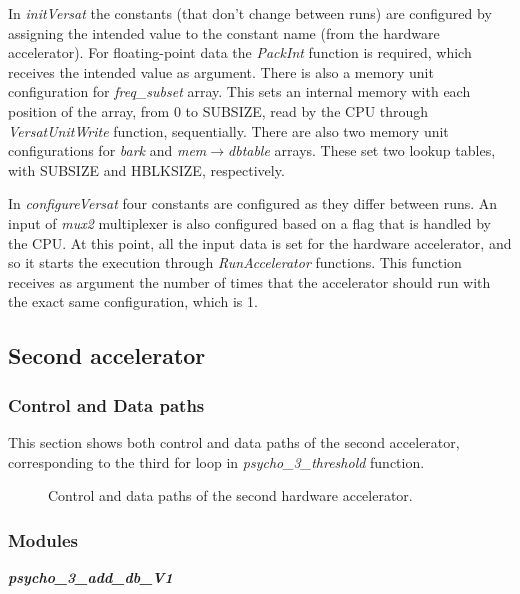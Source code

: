 \documentclass{article}
\begin{document}
In \textit{initVersat} the constants (that don't change between runs) are configured by assigning the intended value to the constant name (from the hardware accelerator). For floating-point data the \textit{PackInt} function is required, which receives the intended value as argument.
There is also a memory unit configuration for \textit{freq\_subset} array. This sets an internal memory with each position of the array, from 0 to SUBSIZE, read by the CPU through \textit{VersatUnitWrite} function, sequentially.
There are also two memory unit configurations for \textit{bark} and \textit{mem}$\rightarrow$\textit{dbtable} arrays. These set two lookup tables, with SUBSIZE and HBLKSIZE, respectively.

In \textit{configureVersat} four constants are configured as they differ between runs. An input of \textit{mux2} multiplexer is also configured based on a flag that is handled by the CPU.
At this point, all the input data is set for the hardware accelerator, and so it starts the execution through \textit{RunAccelerator} functions. This function receives as argument the number of times that the accelerator should run with the exact same configuration, which is 1.


\subsection{Second accelerator}

\subsubsection{Control and Data paths}
This section shows both control and data paths of the second accelerator, corresponding to the third for loop in \textit{psycho\_3\_threshold} function.

\begin{figure}[H]
\centerline{}
\caption{Control and data paths of the second hardware accelerator.}
\label{data2}
\end{figure}

\subsubsection{Modules}

\vspace{0.5cm}

\textbf{\textit{psycho\_3\_add\_db\_V1}}
\end{document}
